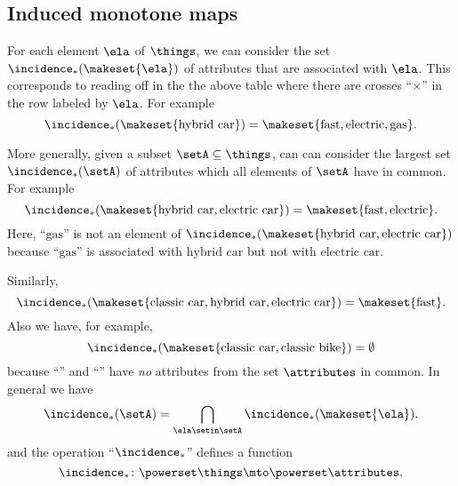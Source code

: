 \subsection{Induced monotone maps}

For each element $\ela$ of $\things$, we can consider the set $\incidence_*(\makeset{\ela})$ of attributes that are associated with $\ela$. This corresponds to reading off in the the above table where there are crosses ``$\times$'' in the row labeled by $\ela$. For example
\begin{equation}\label{eq:fca-example-pushforward-1}
\incidence_*(\makeset{\text{hybrid car}}) = \makeset{\text{fast}, \text{electric}, \text{gas}}. 
\end{equation}


More generally, given a subset $\setA \subseteq \things$, can can consider the largest set $\incidence_*(\setA)$ of attributes which all elements of $\setA$ have in common. For example 
\begin{equation}\label{eq:fca-example-pushforward-2}
\incidence_*(\makeset{\text{hybrid car}, \text{electric car}}) = \makeset{\text{fast}, \text{electric}}. 
\end{equation}
Here, ``$\text{gas}$'' is not an element of $\incidence_*(\makeset{\text{hybrid car}, \text{electric car}})$ because ``$\text{gas}$'' is associated with $\text{hybrid car}$ but not with $\text{electric car}$.  

Similarly, 
\begin{equation}\label{eq:fca-example-pushforward-3}
\incidence_*(\makeset{\text{classic car}, \text{hybrid car}, \text{electric car}}) = \makeset{\text{fast}}. 
\end{equation}
Also we have, for example, 
\begin{equation}\label{eq:fca-example-pushforward-4}
\incidence_*(\makeset{\text{classic car}, \text{classic bike}}) = \emptyset
\end{equation}
because ``'' and ``'' have \emph{no} attributes from the set $\attributes$ in common. In general we have 
\begin{equation}\label{eq:fca-example-pushforward-5}
\incidence_*(\setA) = \bigcap_{\ela \setin \setA} \incidence_*(\makeset{\ela}).
\end{equation}
and the operation ``$\incidence_*$'' defines a function 
\begin{equation}\label{eq:fca-example-pushforward-6}
\incidence_* \colon \powerset \things \mto \powerset \attributes.
\end{equation}

